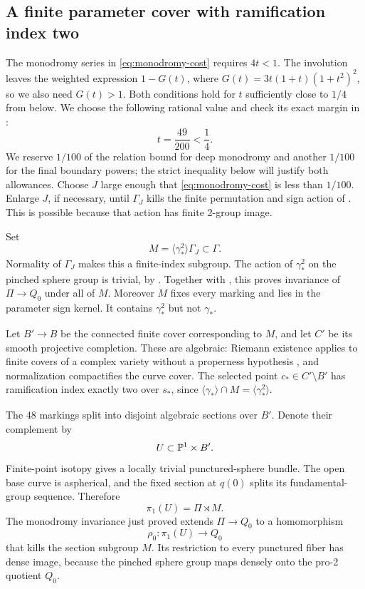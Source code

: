 \subsection{A finite parameter cover with ramification index two}

The monodromy series in \eqref{eq:monodromy-cost} requires $4t<1$.
The involution leaves the weighted expression $1-G(t)$, where
$G(t)=3t(1+t)(1+t^2)^2$, so we also need $G(t)>1$.
Both conditions hold for $t$ sufficiently close to $1/4$ from below.
We choose the following rational value and check its exact margin
in :
\begin{equation}\label{eq:t-choice}
 t=\frac{49}{200}<\frac14.
\end{equation}
We reserve $1/100$ of the relation bound for deep monodromy and another
$1/100$ for the final boundary powers; the strict inequality below will
justify both allowances. Choose $J$ large enough that \eqref{eq:monodromy-cost} is less than $1/100$. Enlarge $J$, if necessary, until $\Gamma_J$ kills the finite permutation and sign action of . This is possible because that action has finite 2-group image.

Set
\[
 M=\langle\gamma_*^2\rangle\Gamma_J\subset\Gamma.
\]
Normality of $\Gamma_J$ makes this a finite-index subgroup. The action of $\gamma_*^2$ on the pinched sphere group is trivial, by . Together with , this proves invariance of $\Pi\to Q_0$ under all of $M$. Moreover $M$ fixes every marking and lies in the parameter sign kernel. It contains $\gamma_*^2$ but not $\gamma_*$.

Let $B'\to B$ be the connected finite cover corresponding to $M$, and let $C'$ be its smooth projective completion. These are algebraic: Riemann existence applies to finite covers of a complex variety without a properness hypothesis \citep[Expos\'e XII, Th\'eor\`eme 5.1]{SGA1}, and normalization compactifies the curve cover. The selected point $c_*\in C'\setminus B'$ has ramification index exactly two over $s_*$, since $\langle\gamma_*\rangle\cap M=\langle\gamma_*^2\rangle$.

The $48$ markings split into disjoint algebraic sections over $B'$. Denote their complement by
\[
 U\subset\mathbb P^1\times B'.
\]
Finite-point isotopy gives a locally trivial punctured-sphere bundle. The open base curve is aspherical, and the fixed section at $q(0)$ splits its fundamental-group sequence. Therefore
\[
 \pi_1(U)=\Pi\rtimes M.
\]
The monodromy invariance just proved extends $\Pi\to Q_0$ to a homomorphism
\begin{equation}\label{eq:rho-zero}
 \rho_0:\pi_1(U)\longrightarrow Q_0
\end{equation}
that kills the section subgroup $M$. Its restriction to every punctured fiber has dense image, because the pinched sphere group maps densely onto the pro-2 quotient $Q_0$.


